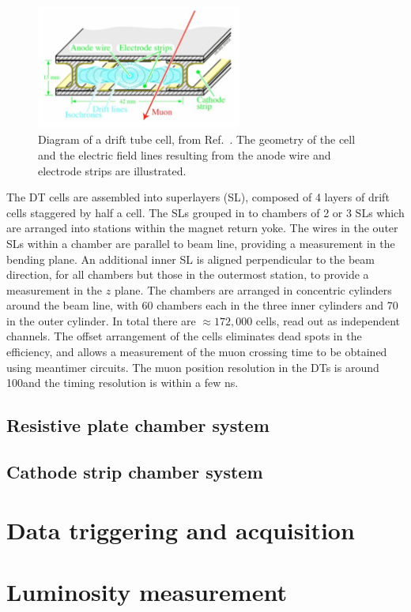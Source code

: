 \begin{figure}[htbp]
  \centering
   \includegraphics[width=0.6\textwidth]{figures/LHCandCMS/DriftTubeCutaway.png}
  \caption{
    Diagram of a drift tube cell, from Ref.~\cite{}. The 
    geometry of the cell and the electric field lines resulting from the 
    anode wire and electrode strips are illustrated.
        }
 \label{fig:DTs}
\end{figure}


The DT cells are assembled into superlayers (SL), composed of 
4 layers of drift cells staggered by half a cell. 
The SLs grouped in to chambers of 2 or 3 SLs which are arranged into stations
within the magnet return yoke.
The wires in the outer SLs within a chamber are parallel to beam line, providing
a measurement in the bending plane.
An additional inner SL is aligned perpendicular to the beam direction, 
for all chambers but those in the 
outermost station, to provide a measurement in the $z$ plane. 
The chambers are arranged in concentric cylinders
around the beam line, with 60 chambers each in the three inner cylinders
and 70 in the outer cylinder. In total there are $\approx172,000$ 
cells, read out as independent channels. The offset arrangement of the cells
eliminates dead spots in the efficiency, and allows a measurement of the
muon crossing time to be obtained using meantimer circuits.
The muon position resolution in the DTs is around 100\micron and the
timing resolution is within a few ns.

\subsection{Resistive plate chamber system}



\subsection{Cathode strip chamber system}
\section{Data triggering and acquisition}
\section{Luminosity measurement}

